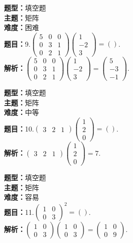 \documentclass{ctexart}
\newenvironment{question}[5]{%
	\noindent\textbf{题型：}#1\\
	\textbf{主题：}#2\\
	\textbf{难度：}#3\\
	\textbf{题目：}#4\\
	\textbf{解析：}#5\\
	\vspace{1em}
}{}
\begin{document}
	\begin{question}
		{填空题}
		{矩阵}
		{困难}
		{9.\(\left(\begin{array}{lll}5 & 0 & 0 \\ 0 & 3 & 1 \\ 0 & 2 & 1\end{array}\right)\left(\begin{array}{c}1 \\ -2 \\ 3\end{array}\right)=()\).}
		{\(\left(\begin{array}{lll}5 & 0 & 0 \\ 0 & 3 & 1 \\ 0 & 2 & 1\end{array}\right)\left(\begin{array}{c}1 \\ -2 \\ 3\end{array}\right)=\left(\begin{array}{c}5 \\ -3 \\ -1\end{array}\right)\).}
	\end{question}
	
	\begin{question}
		{填空题}
		{矩阵}
		{中等}
		{10.\(\left(\begin{array}{lll}3 & 2 & 1\end{array}\right)\left(\begin{array}{l}1 \\ 2 \\ 0\end{array}\right)=()\).}
		{\(\left(\begin{array}{lll}3 & 2 & 1\end{array}\right)\left(\begin{array}{l}1 \\ 2 \\ 0\end{array}\right)=7\).}
	\end{question}
	
	\begin{question}
		{填空题}
		{矩阵}
		{容易}
		{11.\(\left(\begin{array}{ll}1 & 0 \\ 0 & 3\end{array}\right)^2=()\). }
		{\(\left(\begin{array}{ll}1 & 0 \\ 0 & 3\end{array}\right)\left(\begin{array}{ll}1 & 0 \\ 0 & 3\end{array}\right)=\left(\begin{array}{ll}1 & 0 \\ 0 & 9\end{array}\right)\). }
	\end{question}
	
\end{document}
